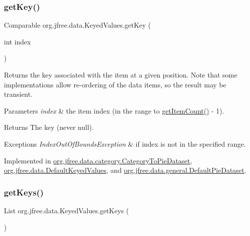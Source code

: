 \subsubsection{\texorpdfstring{get\+Key()}{getKey()}}
{\footnotesize\ttfamily Comparable org.\+jfree.\+data.\+Keyed\+Values.\+get\+Key (\begin{DoxyParamCaption}\item[{int}]{index }\end{DoxyParamCaption})}

Returns the key associated with the item at a given position. Note that some implementations allow re-\/ordering of the data items, so the result may be transient.


\begin{DoxyParams}{Parameters}
{\em index} & the item index (in the range {} to {\ttfamily \mbox{\hyperlink{interfaceorg_1_1jfree_1_1data_1_1_values_afd00781dbc2e351b7a77aca9a91ca0a9}{get\+Item\+Count()}} -\/ 1}).\\
\hline
\end{DoxyParams}
\begin{DoxyReturn}{Returns}
The key (never {\ttfamily null}).
\end{DoxyReturn}

\begin{DoxyExceptions}{Exceptions}
{\em Index\+Out\+Of\+Bounds\+Exception} & if {\ttfamily index} is not in the specified range. \\
\hline
\end{DoxyExceptions}


Implemented in \mbox{\hyperlink{classorg_1_1jfree_1_1data_1_1category_1_1_category_to_pie_dataset_a5e57f6d91a01781de16ac109e3933d1d}{org.\+jfree.\+data.\+category.\+Category\+To\+Pie\+Dataset}}, \mbox{\hyperlink{classorg_1_1jfree_1_1data_1_1_default_keyed_values_adde9e3ec6af9e5fbbf0406f056204b51}{org.\+jfree.\+data.\+Default\+Keyed\+Values}}, and \mbox{\hyperlink{classorg_1_1jfree_1_1data_1_1general_1_1_default_pie_dataset_afafc2cf6169c3cc0af9c9422023f1b19}{org.\+jfree.\+data.\+general.\+Default\+Pie\+Dataset}}.

\mbox{\label{interfaceorg_1_1jfree_1_1data_1_1_keyed_values_a5bc1316f3c71eeaa6e38effe4ea660d5}} 
\subsubsection{\texorpdfstring{get\+Keys()}{getKeys()}}
{\footnotesize\ttfamily List org.\+jfree.\+data.\+Keyed\+Values.\+get\+Keys (\begin{DoxyParamCaption}{ }\end{DoxyParamCaption})}

